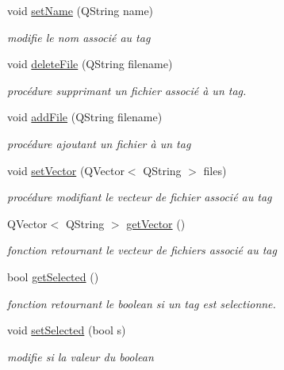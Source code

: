 \begin{DoxyCompactItemize}
void \hyperlink{classtag_a0566adcb0d18f06a37f456d9fb52ae9e}{set\-Name} (Q\-String name)
\begin{DoxyCompactList}\small\item\em modifie le nom associé au tag \end{DoxyCompactList}\item 
void \hyperlink{classtag_a0a0380b3ce237616186cd22e04c16005}{delete\-File} (Q\-String filename)
\begin{DoxyCompactList}\small\item\em procédure supprimant un fichier associé à un tag. \end{DoxyCompactList}\item 
void \hyperlink{classtag_a27bb06f6a7a0615db567df84d0357721}{add\-File} (Q\-String filename)
\begin{DoxyCompactList}\small\item\em procédure ajoutant un fichier à un tag \end{DoxyCompactList}\item 
void \hyperlink{classtag_aaadbc35ac88e71a9679188ce50d92ef9}{set\-Vector} (Q\-Vector$<$ Q\-String $>$ files)
\begin{DoxyCompactList}\small\item\em procédure modifiant le vecteur de fichier associé au tag \end{DoxyCompactList}\item 
Q\-Vector$<$ Q\-String $>$ \hyperlink{classtag_a444e286ff40c9aca8c7cc74032c764af}{get\-Vector} ()
\begin{DoxyCompactList}\small\item\em fonction retournant le vecteur de fichiers associé au tag \end{DoxyCompactList}\item 
bool \hyperlink{classtag_a59991e0c7cdf7cbaaf4e9b818a9d8084}{get\-Selected} ()
\begin{DoxyCompactList}\small\item\em fonction retournant le boolean si un tag est selectionne. \end{DoxyCompactList}\item 
void \hyperlink{classtag_a752cd9e4379c9cce40444a528310fc8c}{set\-Selected} (bool s)
\begin{DoxyCompactList}\small\item\em modifie si la valeur du boolean \end{DoxyCompactList}\end{DoxyCompactItemize}


